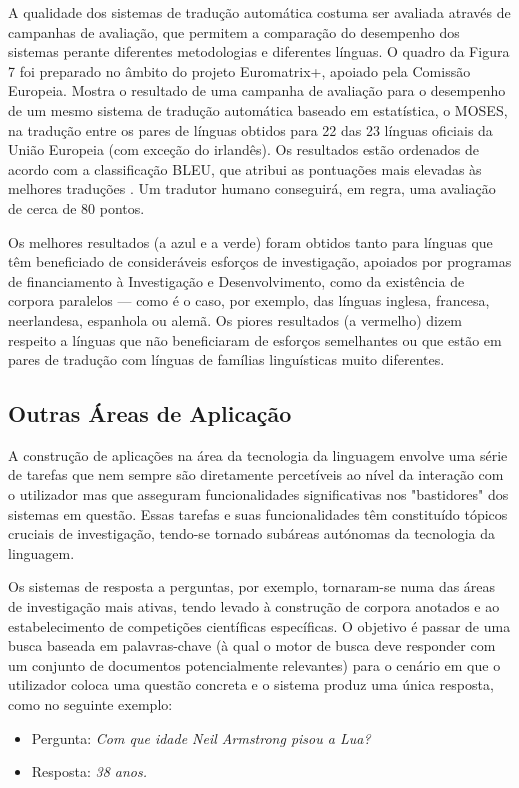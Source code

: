 \begin{multicols}{2}
A qualidade dos sistemas de tradução automática costuma ser avaliada através de campanhas de avaliação, que permitem 
a comparação do desempenho dos sistemas perante diferentes metodologias e diferentes línguas. 
O quadro da Figura 7 foi preparado no âmbito do projeto Euromatrix+, apoiado pela Comissão Europeia.
Mostra o resultado de uma campanha de avaliação para o desempenho de um mesmo sistema
de tradução automática baseado em estatística, o MOSES, na tradução entre 
os pares de línguas obtidos para 22 das 23 línguas oficiais da União Europeia (com exceção do irlandês).
Os resultados estão ordenados de acordo com a classificação BLEU, que atribui as pontuações mais elevadas às melhores traduções \cite{bleu1}.  
Um tradutor humano conseguirá, em regra, uma avaliação de cerca de 80 pontos.

Os melhores resultados (a azul e a verde) foram obtidos tanto para línguas que têm beneficiado de consideráveis esforços de investigação,
apoiados por programas de financiamento à Investigação e Desenvolvimento, como da existência de corpora paralelos ---
como é o caso, por exemplo, das línguas inglesa, francesa, neerlandesa, espanhola ou alemã. 
Os piores resultados (a vermelho) dizem respeito a línguas que não beneficiaram de esforços semelhantes 
ou que estão em pares de tradução com línguas de famílias linguísticas muito diferentes.



\subsection{Outras Áreas de Aplicação}

A construção de aplicações na área da tecnologia da linguagem envolve uma série de tarefas que nem sempre são 
diretamente percetíveis ao nível da interação com o utilizador
mas que asseguram funcionalidades significativas 
nos "bastidores" dos sistemas em questão. 
Essas tarefas e suas funcionalidades têm constituído tópicos cruciais de investigação, tendo-se tornado 
subáreas autónomas da tecnologia da linguagem.


Os sistemas de resposta a perguntas, por exemplo, tornaram-se numa das áreas de investigação mais ativas, 
tendo levado à construção de corpora anotados e ao estabelecimento de competições
científicas específicas. O objetivo é passar de uma busca baseada em palavras-chave 
(à qual o motor de busca deve responder com um conjunto de do\-cu\-men\-tos potencialmente relevantes) 
para o cenário em que o utilizador coloca uma questão concreta e o sistema produz uma única resposta,
como no seguinte exemplo:
\begin{itemize}
  \item[] Pergunta: \textit{Com que idade Neil Armstrong pisou a Lua?}
  \item[] Resposta: \textit{38 anos.}
\end{itemize}



\end{multicols}
